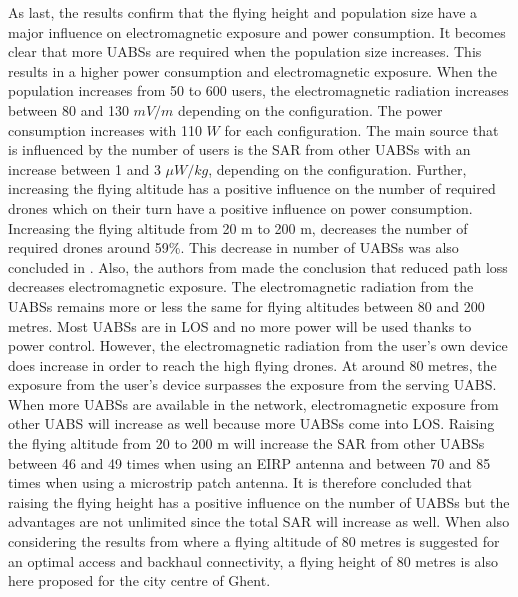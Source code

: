 As last, the results confirm that the flying height and population size have a major influence on electromagnetic exposure and 
power consumption. It becomes clear that more \gls{UABS}s are required when the population size increases. 
This results in a higher power 
consumption and electromagnetic exposure. When the population increases from 50 to 600 users, 
the electromagnetic radiation increases between 80 and 130 $mV/m$ depending
on the configuration. The power consumption increases with 110 $W$ for each configuration. 
The main source that is influenced by the number of users is the \gls{SAR} from other \gls{UABS}s with an increase between 1 and 3 $\mu W/kg$, depending on 
the configuration.
Further, increasing the flying altitude has a positive influence on the number of required drones which on their 
turn have a positive influence on power consumption. Increasing the flying altitude from 20 m to 200 m, decreases the number 
of required drones around 59\%. This decrease in number of \gls{UABS}s was also concluded in \cite{J2}.
Also, the authors from \cite{J17_kuehn2019modelling} made the conclusion that reduced path loss decreases electromagnetic exposure.
The electromagnetic radiation from the \gls{UABS}s remains more or less the same for flying altitudes between 80 and 200 metres. Most 
\gls{UABS}s are in \gls{LOS} and no more power will be used thanks to power control.
However, the electromagnetic radiation from the user's own device does increase in order to reach the high flying drones.
At around 80 metres, the exposure from the  user's device surpasses the exposure from the serving \gls{UABS}.
When more \gls{UABS}s are available in the network, electromagnetic exposure from other \gls{UABS} will increase as well 
because more \gls{UABS}s come into \gls{LOS}. Raising the flying altitude from 20 to 200 m will increase the \gls{SAR} from other 
\gls{UABS}s between 46 and 49 times when using an \gls{EIRP} antenna and between 70 and 85 times when using a microstrip patch antenna.
It is therefore concluded that raising the flying height has a positive influence on the number of 
\gls{UABS}s but the advantages are not unlimited since the total \gls{SAR} will increase as well.
When also considering the results from \cite{U1} where a flying altitude of  
80 metres is suggested for an optimal access and backhaul connectivity, a flying height 
of 80 metres is also here proposed for the city centre of Ghent.

